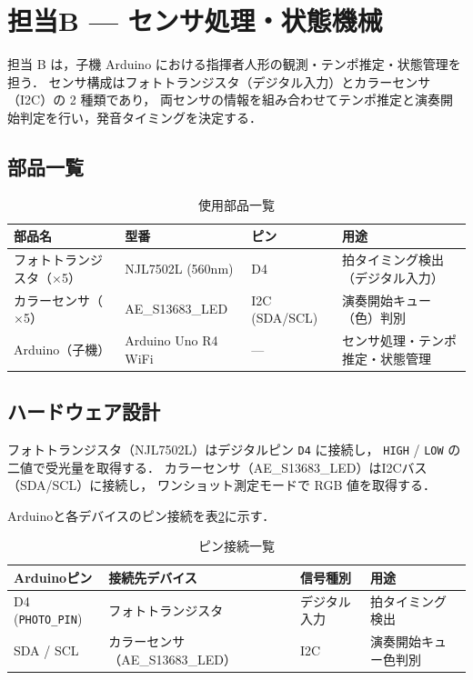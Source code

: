 \section{担当B — センサ処理・状態機械}

担当 B は，子機 Arduino における指揮者人形の観測・テンポ推定・状態管理を担う．
センサ構成はフォトトランジスタ（デジタル入力）とカラーセンサ（I2C）の 2 種類であり，
両センサの情報を組み合わせてテンポ推定と演奏開始判定を行い，発音タイミングを決定する．

\subsection{部品一覧}

\begin{table}[H]
\centering
\caption{使用部品一覧}
\label{tab:parts_B}
\begin{tabular}{p{4cm}p{5cm}p{2.5cm}p{3cm}}
\hline
\textbf{部品名} & \textbf{型番} & \textbf{ピン} & \textbf{用途} \\
\hline
フォトトランジスタ（$\times$5） & NJL7502L (560nm) & D4 & 拍タイミング検出（デジタル入力） \\
\hline
カラーセンサ（$\times$5） & AE\_S13683\_LED & I2C (SDA/SCL) & 演奏開始キュー（色）判別 \\
\hline
Arduino（子機） & Arduino Uno R4 WiFi & — & センサ処理・テンポ推定・状態管理 \\
\hline
\end{tabular}
\end{table}

\subsection{ハードウェア設計}

フォトトランジスタ（NJL7502L）はデジタルピン \texttt{D4} に接続し，
\texttt{HIGH} / \texttt{LOW} の二値で受光量を取得する．
カラーセンサ（AE\_S13683\_LED）はI2Cバス（SDA/SCL）に接続し，
ワンショット測定モードで RGB 値を取得する．

Arduinoと各デバイスのピン接続を表\ref{tab:pins_B}に示す．

\begin{table}[H]
\centering
\caption{ピン接続一覧}
\label{tab:pins_B}
\begin{tabular}{p{2.5cm}p{4cm}p{2.5cm}p{4cm}}
\hline
\textbf{Arduinoピン} & \textbf{接続先デバイス} & \textbf{信号種別} & \textbf{用途} \\
\hline
D4 (\texttt{PHOTO\_PIN}) & フォトトランジスタ & デジタル入力 & 拍タイミング検出 \\
\hline
SDA / SCL                & カラーセンサ（AE\_S13683\_LED） & I2C & 演奏開始キュー色判別 \\
\hline
\end{tabular}
\end{table}

